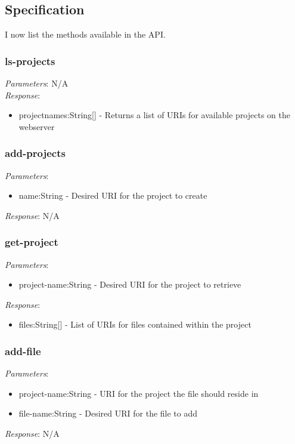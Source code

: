 \documentclass{report}
\begin{document}


\subsection{Specification}
I now list the methods available in the API.
\subsubsection{ls-projects}

\emph{Parameters}: N/A
\\
\emph{Response}: 
\begin{itemize}
\item projectnames:String[] - Returns a list of URIs for available projects on the webserver
\end{itemize} 

\subsubsection{add-projects}

\emph{Parameters}: 
\begin{itemize}
\item name:String - Desired URI for the project to create
\end{itemize}
\emph{Response}: N/A

\subsubsection{get-project}
\emph{Parameters}: 
\begin{itemize}
\item project-name:String - Desired URI for the project to retrieve
\end{itemize}
\emph{Response}: 
\begin{itemize}
\item files:String[] - List of URIs for files contained within the project 
\end{itemize}

\subsubsection{add-file}
\emph{Parameters}: 
\begin{itemize}
\item project-name:String - URI for the project the file should reside in
\item file-name:String - Desired URI for the file to add
\end{itemize}
\emph{Response}: N/A
\end{document}
